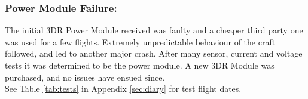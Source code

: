\subsubsection*{Power Module Failure:}  The initial 3DR Power Module received was faulty and a cheaper third party one was used for a few flights. Extremely unpredictable behaviour of the craft followed, and led to another major crash. After many sensor, current and voltage tests it was determined to be the power module. A new 3DR Module was purchased, and no issues have ensued since.\\  

See Table \ref{tab:tests} in Appendix \ref{sec:diary} for test flight dates.
